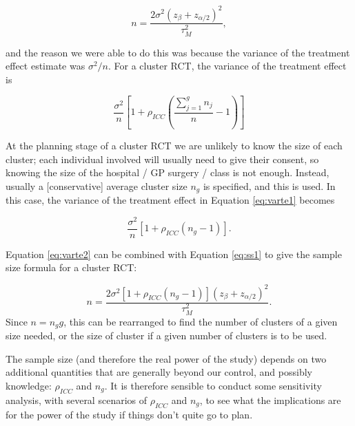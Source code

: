 \documentclass[
  openany]{book}
\theoremstyle{definition}
\theoremstyle{definition}
\theoremstyle{definition}
\theoremstyle{definition}
\theoremstyle{remark}
\begin{document}
\begin{equation}
n = \frac{2\sigma^2\left(z_{\beta} + z_{\alpha/2}\right)^2}{\tau^2_M}, 
\label{eq:ss1}
\end{equation}

and the reason we were able to do this was because the variance of the treatment effect estimate was \(\sigma^2/n\).
For a cluster RCT, the variance of the treatment effect is

\begin{equation}
\frac{\sigma^2}{n} \left[1 + \rho_{ICC}\left(\frac{\sum\limits_{j=1}^g n_j}{n}-1\right)\right]
\label{eq:varte1}
\end{equation}

At the planning stage of a cluster RCT we are unlikely to know the size of each cluster; each individual involved will usually need to give their consent, so knowing the size of the hospital / GP surgery / class is not enough. Instead, usually a {[}conservative{]} average cluster size \(n_g\) is specified, and this is used. In this case, the variance of the treatment effect in Equation \eqref{eq:varte1} becomes

\begin{equation}
\frac{\sigma^2}{n} \left[1 + \rho_{ICC}\left(n_g-1\right)\right] .
\label{eq:varte2}
\end{equation}

Equation \eqref{eq:varte2} can be combined with Equation \eqref{eq:ss1} to give the sample size formula for a cluster RCT:

\[n = \frac{2\sigma^2\left[1 + \rho_{ICC}\left(n_g-1\right)\right]\left(z_{\beta} + z_{\alpha/2}\right)^2}{\tau^2_M}.
 \]
Since \(n=n_gg\), this can be rearranged to find the number of clusters of a given size needed, or the size of cluster if a given number of clusters is to be used.

The sample size (and therefore the real power of the study) depends on two additional quantities that are generally beyond our control, and possibly knowledge: \(\rho_{ICC}\) and \(n_g\). It is therefore sensible to conduct some sensitivity analysis, with several scenarios of \(\rho_{ICC}\) and \(n_g\), to see what the implications are for the power of the study if things don't quite go to plan.
\end{document}

